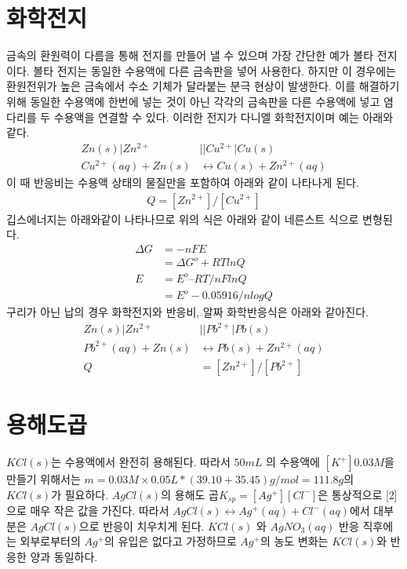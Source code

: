 \documentclass[%
 reprint,
 amsmath,amssymb,
 aps,
]{revtex4-2}
\begin{document}
\section{\label{sec:level2}화학전지}
금속의 환원력이 다름을 통해 전지를 만들어 낼 수 있으며 가장 간단한 예가 볼타 전지이다. 볼타 전지는 동일한 수용액에 다른 금속판을 넣어 사용한다. 하지만 이 경우에는 환원전위가 높은 금속에서 수소 기체가 달라붙는 분극 현상이 발생한다. 이를 해결하기 위해 동일한 수용액에 한번에 넣는 것이 아닌 각각의 금속판을 다른 수용액에 넣고 염다리를 두 수용액을 연결할 수 있다. 이러한 전지가 다니엘 화학전지이며 예는 아래와 같다.
\begin{align}
Zn(s) | Zn^{2+} &|| Cu^{2+}|Cu(s)\\
Cu^{2+}(aq) + Zn(s) &\leftrightarrow Cu(s) + Zn^{2+}(aq)
\end{align}
이 때 반응비는 수용액 상태의 물질만을 포함하여 아래와 같이 나타나게 된다.
\begin{align}
Q = [Zn^{2+}]/[Cu^{2+}]
\end{align}
깁스에너지는 아래와같이 나타나므로 위의 식은 아래와 같이 네른스트 식으로 변형된다.
\begin{align}
\Delta G &= - nFE\\
&= \Delta G^{o} + RT lnQ\\
E &= E^{o} – RT/nF lnQ\\
&= E^{o}-0.05916/n logQ
\end{align}
구리가 아닌 납의 경우 화학전지와 반응비, 알짜 화학반응식은 아래와 같아진다.
\begin{align}
Zn(s) | Zn^{2+} &|| Pb^{2+}|Pb(s)\\
Pb^{2+}(aq) + Zn(s) &\leftrightarrow Pb(s) + Zn^{2+}(aq)\\
Q &= [Zn^{2+}]/[Pb^{2+}]
\end{align}

\section{\label{sec:level2}용해도곱}
$KCl(s)$는 수용액에서 완전히 용해된다. 따라서 $50mL$ 의 수용액에 $[K^{+}] 0.03M$을 만들기 위해서는 $m= 0.03M \times 0.05L * (39.10 + 35.45) g / mol = 111.8g$의 $KCl(s)$가 필요하다. $AgCl(s)$의 용해도 곱$ K_{sp} = [Ag^{+}][Cl^{-}]$은 통상적으로 [2]으로 매우 작은 값을 가진다. 따라서 $AgCl(s) \leftrightarrow Ag^{+}(aq) + Cl^{-}(aq)$에서 대부분은 $AgCl(s)$으로 반응이 치우치게 된다. $KCl(s)$ 와 $AgNO_{3}(aq)$ 반응 직후에는 외부로부터의 $Ag^{+}$의 유입은 없다고 가정하므로 $Ag^{+}$의 농도 변화는 $KCl(s)$와 반응한 양과 동일하다.
\end{document}
